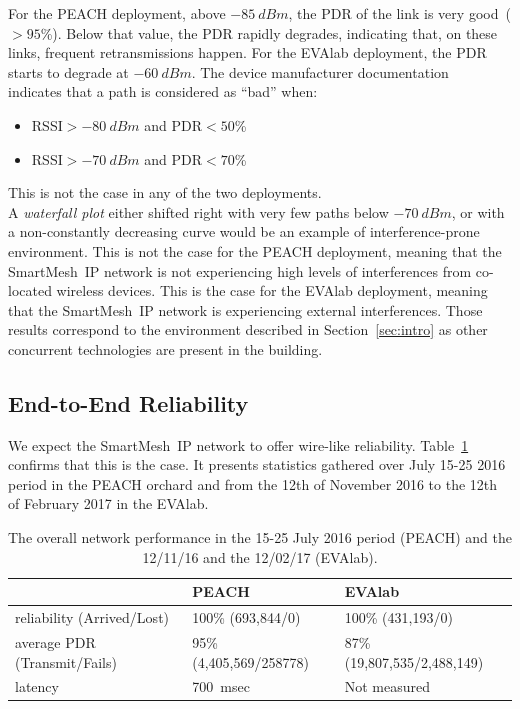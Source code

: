 \documentclass{elsarticle}
\newcommand{\smip}                {SmartMesh~IP\xspace}
\newcommand{\PEACHNUMPCKTS}       {693,844\xspace}
\newcommand{\EVANUMPCKTS}         {431,193\xspace}
\begin{document}
For the PEACH deployment, above $-85~dBm$, the PDR of the link is very good~($>95$\%).
Below that value, the PDR rapidly degrades, indicating that, on these links, frequent retransmissions happen.
For the EVAlab deployment, the PDR starts to degrade at $-60~dBm$.
The device manufacturer documentation~\cite{smip_app_note} indicates that a path is considered as ``bad'' when:

\begin{itemize}
    \item RSSI$>-80~dBm$ and PDR$<50$\%
    \item RSSI$>-70~dBm$ and PDR$<70$\%
\end{itemize}

This is not the case in any of the two deployments.\\


A \textit{waterfall plot} either shifted right with very few paths below $-70~dBm$, or with a non-constantly decreasing curve would be an example of interference-prone environment.
This is not the case for the PEACH deployment, meaning that the \smip network is not experiencing high levels of interferences from co-located wireless devices.
This is the case for the EVAlab deployment, meaning that the \smip network is experiencing external interferences.
Those results correspond to the environment described in Section~\ref{sec:intro} as other concurrent technologies are present in the building.

\subsection{End-to-End Reliability}
\label{sec:net_reliability}


We expect the \smip network to offer wire-like reliability.
Table~\ref{tab:net_stats} confirms that this is the case.
It presents statistics gathered over July 15-25 2016 period in the PEACH orchard and from the 12th of November 2016 to the 12th of February 2017 in the EVAlab.

\begin{table}
    \begin{tabular}{|l|l|l|}
        \toprule
        {}                              & PEACH                     & EVAlab \\
        \midrule
        reliability (Arrived/Lost)      & 100\% (\PEACHNUMPCKTS/0)  & 100\% (\EVANUMPCKTS/0)\\ \hline
        average PDR (Transmit/Fails)    & 95\% (4,405,569/258778)   & 87\% (19,807,535/2,488,149)\\ \hline
        latency                         & 700~msec                  & Not measured\\
        \bottomrule
    \end{tabular}
    \caption{The overall network performance in the 15-25 July 2016 period (PEACH) and the 12/11/16 and the 12/02/17 (EVAlab).}
    \label{tab:net_stats}
\end{table}
\end{document}
